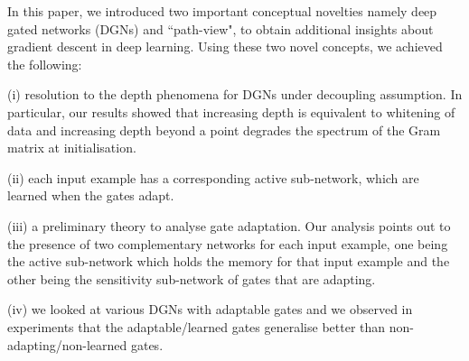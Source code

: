 \begin{comment}
In this paper, we introduced to important conceptual novelties namely deep gated networks (DGNs) and path-view, to obtain additional insights about gradient descent in deep learning. The path-view lead to the following gains: (i) an explicit expression of information propagation in DGNs (ii) explicitly identifying the role of sub-networks in training and generalisation of deep networks, (iii) explicit identification of twin gradient flow, wherein, one component of the gradient flow to train the path strengths keeping the sub-network constant and the other component of the gradient takes care of learning the gating values. Using the path-view and the DGNs, we showed  i) the depth helps is equivalent to whitening of data and increasing depth beyond degrades the spectrum of the Gram matrix at initialisation, and ii) gate adaptation, i.e., the role played by the dynamics of the gates is important for generalisation performance.

We looked at various DGNs with adaptable gates and we observed  in experiments that the adaptable/learned gates generalise better than non-adapting/non-learned gates.  Based on our theory and experiments, we conclude that \emph{understanding generalisation would involve a study of gate adaptation}.
\end{comment}

In this paper, we introduced two important conceptual novelties namely deep gated networks (DGNs) and ``path-view", to obtain additional insights about gradient descent in deep learning. Using these two novel concepts, we achieved the following:

 (i) resolution to the depth phenomena for DGNs under decoupling assumption. In particular, our results showed that increasing depth is equivalent to whitening of data and increasing depth beyond a point degrades the spectrum of the Gram matrix at initialisation.
 
 (ii) each input example has a corresponding active sub-network, which are learned when the gates adapt.
 
 (iii) a preliminary theory to analyse gate adaptation. Our analysis points out to the presence of two complementary networks for each input example, one being the active sub-network which holds the memory for that input example and the other being the sensitivity sub-network of gates that are adapting.
 
(iv) we looked at various DGNs with adaptable gates and we observed  in experiments that the adaptable/learned gates generalise better than non-adapting/non-learned gates.  

